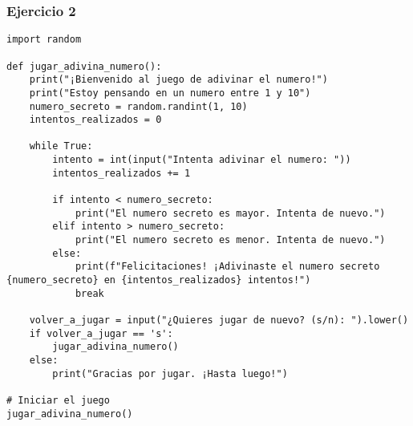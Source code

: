 \documentclass[10pt,a4paper]{article}
\begin{document}
\subsubsection{Ejercicio 2}
\begin{lstlisting}
import random

def jugar_adivina_numero():
    print("¡Bienvenido al juego de adivinar el numero!")
    print("Estoy pensando en un numero entre 1 y 10")
    numero_secreto = random.randint(1, 10)
    intentos_realizados = 0
    
    while True:
        intento = int(input("Intenta adivinar el numero: "))
        intentos_realizados += 1
        
        if intento < numero_secreto:
            print("El numero secreto es mayor. Intenta de nuevo.")
        elif intento > numero_secreto:
            print("El numero secreto es menor. Intenta de nuevo.")
        else:
            print(f"Felicitaciones! ¡Adivinaste el numero secreto {numero_secreto} en {intentos_realizados} intentos!")
            break

    volver_a_jugar = input("¿Quieres jugar de nuevo? (s/n): ").lower()
    if volver_a_jugar == 's':
        jugar_adivina_numero()
    else:
        print("Gracias por jugar. ¡Hasta luego!")

# Iniciar el juego
jugar_adivina_numero()
\end{lstlisting}
\end{document}
